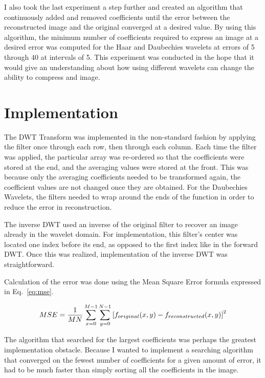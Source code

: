I also took the last experiment a step further and created an algorithm that continuously added and removed coefficients until the error between the reconstructed image and the original converged at a desired value.  By using this algorithm, the minimum number of coefficients required to express an image at a desired error was computed for the Haar and Daubechies wavelets at errors of 5 through 40 at intervals of 5.  This experiment was conducted in the hope that it would give an understanding about how using different wavelets can change the ability to compress and image.

\section{Implementation}

The DWT Transform was implemented in the non-standard fashion by applying the filter once through each row, then through each column.  Each time the filter was applied, the particular array was re-ordered so that the coefficients were stored at the end, and the averaging values were stored at the front.  This was because only the averaging coefficients needed to be transformed again, the coefficient values are not changed once they are obtained.  For the Daubechies Wavelets, the filters needed to wrap around the ends of the function in order to reduce the error in reconstruction.

The inverse DWT used an inverse of the original filter to recover an image already in the wavelet domain.  For implementation, this filter's center was located one index before its end, as opposed to the first index like in the forward DWT.  Once this was realized, implementation of the inverse DWT was straightforward.

Calculation of the error was done using the Mean Square Error formula expressed in Eq.~\ref{eq:mse}.

\begin{equation}
MSE= {1 \over MN} \sum_{x=0}^{M-1} \sum_{y=0}^{N-1} \left[ f_{original}(x,y)-f_{reconstructed}(x,y) \right]^2
\label{eq:mse}
\end{equation}

The algorithm that searched for the largest coefficients was perhaps the greatest implementation obstacle.  Because I wanted to implement a searching algorithm that converged on the fewest number of coefficients for a given amount of error, it had to be much faster than simply sorting all the coefficients in the image.

